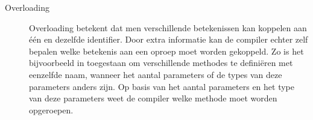 \begin{description}
 \item [Overloading] Overloading betekent dat men verschillende betekenissen kan koppelen aan \'e\'en en dezelfde identifier. Door extra informatie kan de compiler echter zelf bepalen welke betekenis aan een oproep moet worden gekoppeld. Zo is het bijvoorbeeld in \tjava{} toegestaan om verschillende methodes te defini\"eren met eenzelfde naam, wanneer het aantal parameters of de types van deze parameters anders zijn. Op basis van het aantal parameters en het type van deze parameters weet de \tjava{} compiler welke methode moet worden opgeroepen.
\end{description}